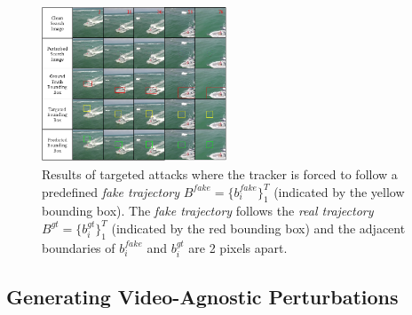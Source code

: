 \documentclass[journal]{IEEEtran}
\begin{document}
\begin{figure}[t]
  \centering
  \includegraphics[width=0.49\textwidth]{images_imperceptible/vis_v7.pdf}
  \caption{Results of targeted attacks where the tracker is forced to follow a predefined \textit{fake trajectory} $B^{fake}=\{b^{fake}_i\}_1^{T}$ (indicated by the yellow bounding box). The \textit{fake trajectory} follows the \textit{real trajectory} $B^{gt}=\{b^{gt}_i\}_1^T$ (indicated by the red bounding box) and the adjacent boundaries of $b^{fake}_i$ and $b^{gt}_i$ are 2 pixels apart.}
  \label{fig:vis1}
\end{figure}

\subsection{Generating Video-Agnostic Perturbations}\label{generate}
\end{document}
